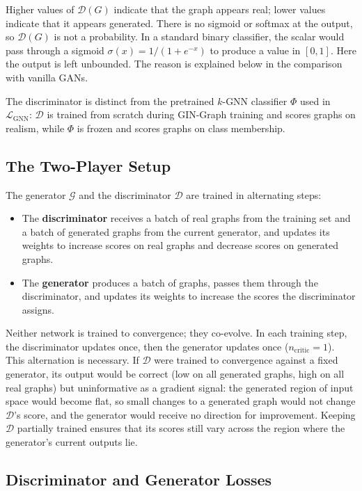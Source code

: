 \documentclass[12pt,a4paper]{article}
\begin{document}
Higher values of $\mathcal{D}(G)$ indicate that the graph appears real; lower values indicate that it appears generated. There is no sigmoid or softmax at the output, so $\mathcal{D}(G)$ is not a probability. In a standard binary classifier, the scalar would pass through a sigmoid $\sigma(x) = 1/(1+e^{-x})$ to produce a value in $[0, 1]$. Here the output is left unbounded. The reason is explained below in the comparison with vanilla GANs.

The discriminator is distinct from the pretrained $k$-GNN classifier $\Phi$ used in $\mathcal{L}_{\text{GNN}}$: $\mathcal{D}$ is trained from scratch during GIN-Graph training and scores graphs on realism, while $\Phi$ is frozen and scores graphs on class membership.

\subsection{The Two-Player Setup}

The generator $\mathcal{G}$ and the discriminator $\mathcal{D}$ are trained in alternating steps:

\begin{itemize}[nosep]
  \item The \textbf{discriminator} receives a batch of real graphs from the training set and a batch of generated graphs from the current generator, and updates its weights to increase scores on real graphs and decrease scores on generated graphs.
  \item The \textbf{generator} produces a batch of graphs, passes them through the discriminator, and updates its weights to increase the scores the discriminator assigns.
\end{itemize}

Neither network is trained to convergence; they co-evolve. In each training step, the discriminator updates once, then the generator updates once ($n_{\text{critic}} = 1$). This alternation is necessary. If $\mathcal{D}$ were trained to convergence against a fixed generator, its output would be correct (low on all generated graphs, high on all real graphs) but uninformative as a gradient signal: the generated region of input space would become flat, so small changes to a generated graph would not change $\mathcal{D}$'s score, and the generator would receive no direction for improvement. Keeping $\mathcal{D}$ partially trained ensures that its scores still vary across the region where the generator's current outputs lie.

\subsection{Discriminator and Generator Losses}
\end{document}
